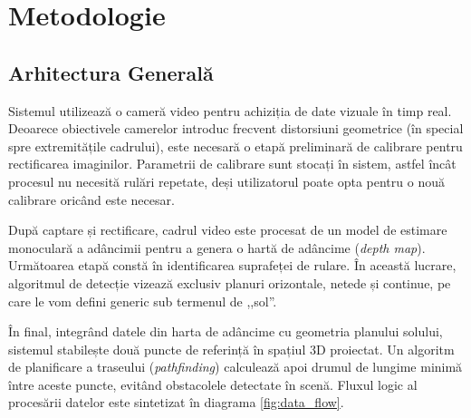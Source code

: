 \chapter{Metodologie}
\label{chap:ch3}

\section{Arhitectura Generală}
\label{sec:ch3sec1}

\par Sistemul utilizează o cameră video pentru achiziția de date vizuale în timp real. Deoarece obiectivele camerelor introduc frecvent distorsiuni geometrice (în special spre extremitățile cadrului), este necesară o etapă preliminară de calibrare pentru rectificarea imaginilor. Parametrii de calibrare sunt stocați în sistem, astfel încât procesul nu necesită rulări repetate, deși utilizatorul poate opta pentru o nouă calibrare oricând este necesar.

După captare și rectificare, cadrul video este procesat de un model de estimare monoculară a adâncimii pentru a genera o hartă de adâncime (\textit{depth map}). Următoarea etapă constă în identificarea suprafeței de rulare. În această lucrare, algoritmul de detecție vizează exclusiv planuri orizontale, netede și continue, pe care le vom defini generic sub termenul de ,,sol''.

În final, integrând datele din harta de adâncime cu geometria planului solului, sistemul stabilește două puncte de referință în spațiul 3D proiectat. Un algoritm de planificare a traseului (\textit{pathfinding}) calculează apoi drumul de lungime minimă între aceste puncte, evitând obstacolele detectate în scenă. Fluxul logic al procesării datelor este sintetizat în diagrama \ref{fig:data_flow}.

